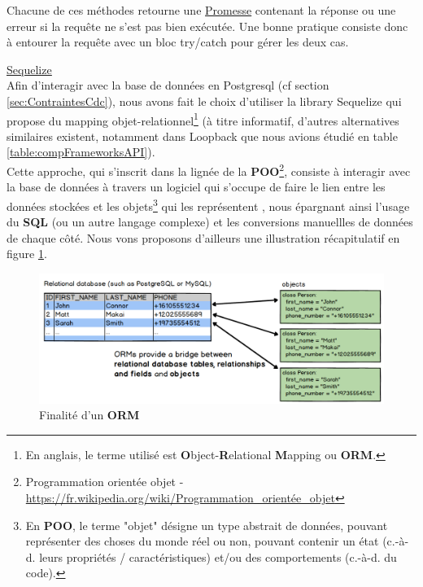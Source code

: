 Chacune de ces méthodes retourne une \href{https://developer.mozilla.org/fr/docs/Web/JavaScript/Guide/Utiliser_les_promesses}{Promesse} contenant la réponse ou une erreur si la requête ne s'est pas bien exécutée. Une bonne pratique consiste donc à entourer la requête avec un bloc try/catch pour gérer les deux cas.\\


\noindent\underline{\href{https://sequelize.org/master/}{Sequelize}}\\

Afin d'interagir avec la base de données en Postgresql (cf section \ref{sec:ContraintesCdc}), nous avons fait le choix d'utiliser la \gls{library} Sequelize qui propose du mapping objet-relationnel\footnote{
    En anglais, le terme utilisé est \textbf{O}bject-\textbf{R}elational \textbf{M}apping ou \textbf{ORM}.
} (à titre informatif, d'autres alternatives similaires existent, notamment dans Loopback que nous avions étudié en table \ref{table:compFrameworksAPI}).\\

Cette approche, qui s'inscrit dans la lignée de la \textbf{POO}\footnote{
    Programmation orientée objet -
    \href{https://fr.wikipedia.org/wiki/Programmation\_orient\%C3\%A9e\_objet}{https://fr.wikipedia.org/wiki/Programmation\_orientée\_objet}
}, consiste à interagir avec la base de données à travers un logiciel qui s'occupe de faire le lien entre les données stockées et les objets\footnote{
    En \textbf{POO}, le terme "objet" désigne un type abstrait de données, pouvant représenter des choses du monde réel ou non, pouvant contenir un état (c.-à-d. leurs propriétés / caractéristiques) et/ou des comportements (c.-à-d. du code).
} qui les représentent
, nous épargnant ainsi l'usage du \textbf{SQL} (ou un autre langage complexe) et les conversions manuellles de données de chaque côté. 
Nous vons proposons d'ailleurs une illustration récapitulatif en figure \ref{fig:ORMExplanations}.

\begin{figure}[H]
    \includegraphics[width=\textwidth,height=\textheight,keepaspectratio]{images/libraries/orms-bridge.png}
    \centering
    \caption[Finalité d'un \textbf{ORM}]{Finalité d'un \textbf{ORM}}
    \label{fig:ORMExplanations}
\end{figure}

